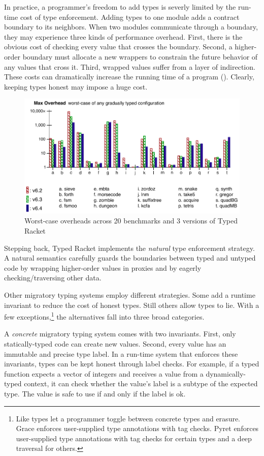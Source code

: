 In practice, a programmer's freedom to add types is severly limited by
 the run-time cost of type enforcement.
Adding types to one module adds a contract boundary to its neighbors.
When two modules communicate through a boundary, they may experience three kinds
 of performance overhead.
First, there is the obvious cost of checking every value that crosses the
 boundary.
Second, a higher-order boundary must allocate a new wrappers to constrain the
 future behavior of any values that cross it.
Third, wrapped values suffer from a layer of indirection.
These costs can dramatically increase the running time of a program
 ().
Clearly, keeping types honest may impose a huge cost.

\begin{figure}[h]
  \includegraphics[width=0.8\columnwidth]{src/jfp-2019-max.png}
  \caption{Worst-case overheads across 20 benchmarks and 3 versions of Typed Racket~\cite{gtnffvf-jfp-2019}}
  \label{fig:max-overhead}
\end{figure}

Stepping back, Typed Racket implements the \emph{natural}\/ type enforcement
 strategy.
A natural semantics carefully guards the boundaries between typed and untyped
 code by wrapping higher-order values in proxies and by eagerly
 checking/traversing other data.

Other migratory typing systems employ different strategies.
Some add a runtime invariant to reduce the cost of honest types.
Still others allow types to lie.
With a few exceptions,\footnote{Like types
 let a programmer toggle between concrete types and erasure.
 Grace enforces user-supplied type annotations with tag checks.
 Pyret enforces user-supplied type annotations with tag checks
  for certain types and a deep traversal for others.}
 the alternatives fall into three broad categories.

A \emph{concrete}\/ migratory typing system comes with two invariants.
First, only statically-typed code can create new values.
Second, every value has an immutable and precise type label.
In a run-time system that enforces these invariants, types can be kept honest
 through label checks.
For example, if a typed function expects a vector of integers and receives
 a value from a dynamically-typed context, it can check whether the value's
 label is a subtype of the expected type.
The value is safe to use if and only if the label is ok.


